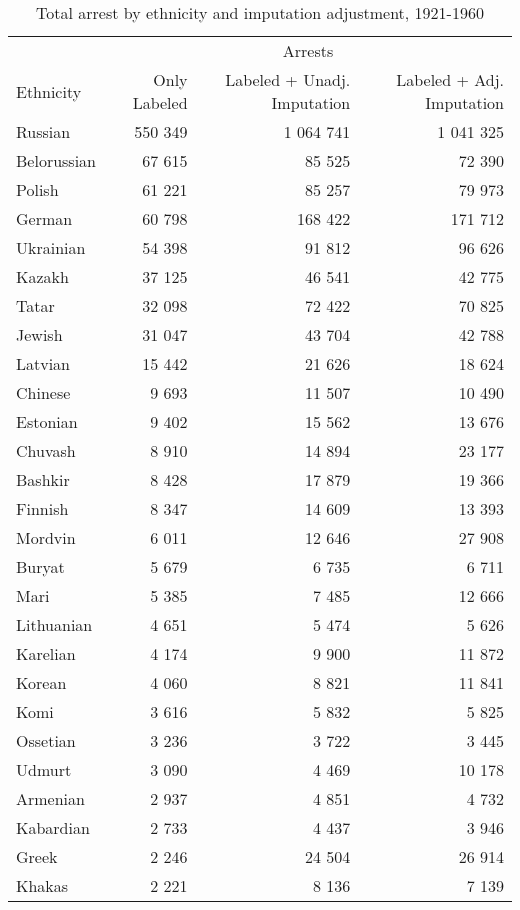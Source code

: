 \begin{table}[!h]

\caption{\label{tab:total_arrests_by_ethnicity}Total arrest by ethnicity and imputation adjustment, 1921-1960}
\centering
\fontsize{8}{10}\selectfont
\begin{tabular}{lrrr}
\toprule
\multicolumn{1}{c}{ } & \multicolumn{3}{c}{Arrests} \\
\cmidrule(l{2pt}r{2pt}){2-4}
Ethnicity & Only Labeled & Labeled + Unadj. Imputation & Labeled + Adj. Imputation\\
\midrule
Russian & 550 349 & 1 064 741 & 1 041 325\\
Belorussian & 67 615 & 85 525 & 72 390\\
Polish & 61 221 & 85 257 & 79 973\\
German & 60 798 & 168 422 & 171 712\\
Ukrainian & 54 398 & 91 812 & 96 626\\
Kazakh & 37 125 & 46 541 & 42 775\\
Tatar & 32 098 & 72 422 & 70 825\\
Jewish & 31 047 & 43 704 & 42 788\\
Latvian & 15 442 & 21 626 & 18 624\\
Chinese & 9 693 & 11 507 & 10 490\\
Estonian & 9 402 & 15 562 & 13 676\\
Chuvash & 8 910 & 14 894 & 23 177\\
Bashkir & 8 428 & 17 879 & 19 366\\
Finnish & 8 347 & 14 609 & 13 393\\
Mordvin & 6 011 & 12 646 & 27 908\\
Buryat & 5 679 & 6 735 & 6 711\\
Mari & 5 385 & 7 485 & 12 666\\
Lithuanian & 4 651 & 5 474 & 5 626\\
Karelian & 4 174 & 9 900 & 11 872\\
Korean & 4 060 & 8 821 & 11 841\\
Komi & 3 616 & 5 832 & 5 825\\
Ossetian & 3 236 & 3 722 & 3 445\\
Udmurt & 3 090 & 4 469 & 10 178\\
Armenian & 2 937 & 4 851 & 4 732\\
Kabardian & 2 733 & 4 437 & 3 946\\
Greek & 2 246 & 24 504 & 26 914\\
Khakas & 2 221 & 8 136 & 7 139\\

\end{tabular}
\end{table}
